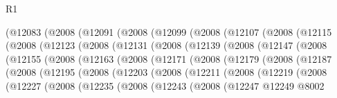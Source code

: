 \begin{lexlean}{R1}
\begin{coremodule}
        (@12083
          (@2008
            (@12091
              (@2008
                (@12099
                  (@2008
                    (@12107
                      (@2008
                        (@12115
                          (@2008
                            (@12123
                              (@2008
                                (@12131
                                  (@2008
                                    (@12139
                                      (@2008
                                        (@12147
                                          (@2008
                                            (@12155
                                              (@2008
                                                (@12163
                                                  (@2008
                                                    (@12171
                                                      (@2008
                                                        (@12179
                                                          (@2008
                                                            (@12187
                                                              (@2008
                                                                (@12195
                                                                  (@2008
                                                                    (@12203
                                                                      (@2008
                                                                        (@12211
                                                                          (@2008
                                                                            (@12219
                                                                              (@2008
                                                                                (@12227
                                                                                  (@2008
                                                                                    (@12235
                                                                                      (@2008
                                                                                        (@12243
                                                                                          (@2008
                                                                                            (@12247
                                                                                              @12249
                                                                                              @8002

\end{coremodule}
\end{lexlean}
